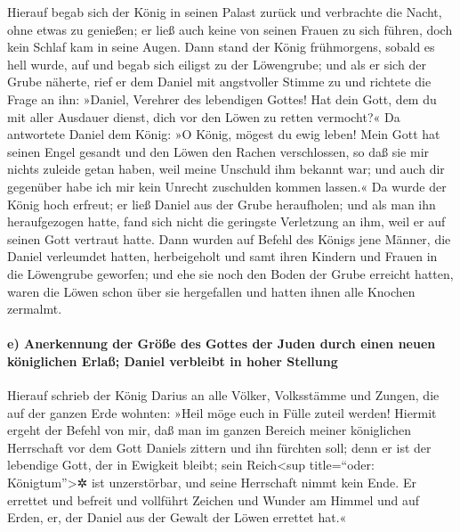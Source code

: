 Hierauf begab sich der König in seinen Palast zurück und
verbrachte die Nacht, ohne etwas zu genießen; er ließ auch keine von
seinen Frauen zu sich führen, doch kein Schlaf kam in seine Augen.
Dann stand der König frühmorgens, sobald es hell wurde,
auf und begab sich eiligst zu der Löwengrube; und als er
sich der Grube näherte, rief er dem Daniel mit angstvoller Stimme zu und
richtete die Frage an ihn: »Daniel, Verehrer des lebendigen Gottes! Hat
dein Gott, dem du mit aller Ausdauer dienst, dich vor den Löwen zu
retten vermocht?« Da antwortete Daniel dem König: »O
König, mögest du ewig leben! Mein Gott hat seinen Engel
gesandt und den Löwen den Rachen verschlossen, so daß sie mir nichts
zuleide getan haben, weil meine Unschuld ihm bekannt war; und auch dir
gegenüber habe ich mir kein Unrecht zuschulden kommen lassen.«
Da wurde der König hoch erfreut; er ließ Daniel aus der
Grube heraufholen; und als man ihn heraufgezogen hatte, fand sich nicht
die geringste Verletzung an ihm, weil er auf seinen Gott vertraut hatte.
Dann wurden auf Befehl des Königs jene Männer, die Daniel
verleumdet hatten, herbeigeholt und samt ihren Kindern und Frauen in die
Löwengrube geworfen; und ehe sie noch den Boden der Grube erreicht
hatten, waren die Löwen schon über sie hergefallen und hatten ihnen alle
Knochen zermalmt.

\hypertarget{e-anerkennung-der-gruxf6uxdfe-des-gottes-der-juden-durch-einen-neuen-kuxf6niglichen-erlauxdf-daniel-verbleibt-in-hoher-stellung}{%
\paragraph{e) Anerkennung der Größe des Gottes der Juden durch einen
neuen königlichen Erlaß; Daniel verbleibt in hoher
Stellung}\label{e-anerkennung-der-gruxf6uxdfe-des-gottes-der-juden-durch-einen-neuen-kuxf6niglichen-erlauxdf-daniel-verbleibt-in-hoher-stellung}}

Hierauf schrieb der König Darius an alle Völker,
Volksstämme und Zungen, die auf der ganzen Erde wohnten: »Heil möge euch
in Fülle zuteil werden! Hiermit ergeht der Befehl von
mir, daß man im ganzen Bereich meiner königlichen Herrschaft vor dem
Gott Daniels zittern und ihn fürchten soll; denn er ist der lebendige
Gott, der in Ewigkeit bleibt; sein Reich\textless sup title=``oder:
Königtum''\textgreater✲ ist unzerstörbar, und seine Herrschaft nimmt
kein Ende. Er errettet und befreit und vollführt Zeichen
und Wunder am Himmel und auf Erden, er, der Daniel aus der Gewalt der
Löwen errettet hat.«

